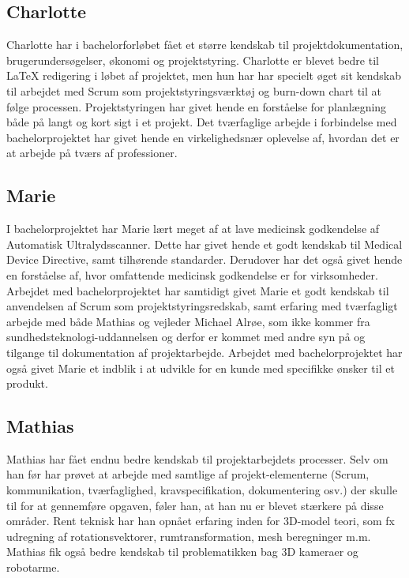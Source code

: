 \subsection{Charlotte}
Charlotte har i bachelorforløbet fået et større kendskab til projektdokumentation, brugerundersøgelser, økonomi og projektstyring. Charlotte er blevet bedre til LaTeX redigering i løbet af projektet, men hun har har specielt øget sit kendskab til arbejdet med Scrum som projektstyringsværktøj og burn-down chart til at følge processen. Projektstyringen har givet hende en forståelse for planlægning både på langt og kort sigt i et projekt. Det tværfaglige arbejde i forbindelse med bachelorprojektet har givet hende en virkelighedsnær oplevelse af, hvordan det er at arbejde på tværs af professioner. 

\subsection{Marie}
I bachelorprojektet har Marie lært meget af at lave medicinsk godkendelse af Automatisk Ultralydsscanner. Dette har givet hende et godt kendskab til Medical Device Directive, samt tilhørende standarder. Derudover har det også givet hende en forståelse af, hvor omfattende medicinsk godkendelse er for virksomheder. Arbejdet med bachelorprojektet har samtidigt givet Marie et godt kendskab til anvendelsen af Scrum som projektstyringsredskab, samt erfaring med tværfagligt arbejde med både Mathias og vejleder Michael Alrøe, som ikke kommer fra sundhedsteknologi-uddannelsen og derfor er kommet med andre syn på og tilgange til dokumentation af projektarbejde. Arbejdet med bachelorprojektet har også givet Marie et indblik i at udvikle for en kunde med specifikke ønsker til et produkt. 

\subsection{Mathias}
Mathias har fået endnu bedre kendskab til projektarbejdets processer. Selv om han før har prøvet at arbejde med samtlige af projekt-elementerne (Scrum, kommunikation, tværfaglighed, kravspecifikation, dokumentering osv.) der skulle til for at gennemføre opgaven, føler han, at han nu er blevet stærkere på disse områder. Rent teknisk har han opnået erfaring inden for 3D-model teori, som fx udregning af rotationsvektorer, rumtransformation, mesh beregninger m.m. Mathias fik også bedre kendskab til problematikken bag 3D kameraer og robotarme.

